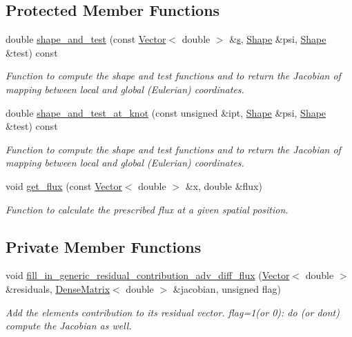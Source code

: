 \subsection*{Protected Member Functions}
\begin{DoxyCompactItemize}
\item 
double \hyperlink{classoomph_1_1AdvectionDiffusionFluxElement_a735b7f2134a85a1f856582f52ad773b1}{shape\+\_\+and\+\_\+test} (const \hyperlink{classoomph_1_1Vector}{Vector}$<$ double $>$ \&\hyperlink{cfortran_8h_ab7123126e4885ef647dd9c6e3807a21c}{s}, \hyperlink{classoomph_1_1Shape}{Shape} \&psi, \hyperlink{classoomph_1_1Shape}{Shape} \&test) const
\begin{DoxyCompactList}\small\item\em Function to compute the shape and test functions and to return the Jacobian of mapping between local and global (Eulerian) coordinates. \end{DoxyCompactList}\item 
double \hyperlink{classoomph_1_1AdvectionDiffusionFluxElement_a32af9be97192954538f40cba54facd83}{shape\+\_\+and\+\_\+test\+\_\+at\+\_\+knot} (const unsigned \&ipt, \hyperlink{classoomph_1_1Shape}{Shape} \&psi, \hyperlink{classoomph_1_1Shape}{Shape} \&test) const
\begin{DoxyCompactList}\small\item\em Function to compute the shape and test functions and to return the Jacobian of mapping between local and global (Eulerian) coordinates. \end{DoxyCompactList}\item 
void \hyperlink{classoomph_1_1AdvectionDiffusionFluxElement_ab21b7655c7d09d338bc4be4baf4dfca6}{get\+\_\+flux} (const \hyperlink{classoomph_1_1Vector}{Vector}$<$ double $>$ \&x, double \&flux)
\begin{DoxyCompactList}\small\item\em Function to calculate the prescribed flux at a given spatial position. \end{DoxyCompactList}\end{DoxyCompactItemize}
\subsection*{Private Member Functions}
\begin{DoxyCompactItemize}
\item 
void \hyperlink{classoomph_1_1AdvectionDiffusionFluxElement_acbc0c8e1e486601c0f09f7ecbb1995c4}{fill\+\_\+in\+\_\+generic\+\_\+residual\+\_\+contribution\+\_\+adv\+\_\+diff\+\_\+flux} (\hyperlink{classoomph_1_1Vector}{Vector}$<$ double $>$ \&residuals, \hyperlink{classoomph_1_1DenseMatrix}{Dense\+Matrix}$<$ double $>$ \&jacobian, unsigned flag)
\begin{DoxyCompactList}\small\item\em Add the element\textquotesingle{}s contribution to its residual vector. flag=1(or 0)\+: do (or don\textquotesingle{}t) compute the Jacobian as well. \end{DoxyCompactList}\end{DoxyCompactItemize}
